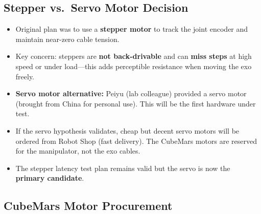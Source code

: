 \documentclass[11pt, a4paper]{article}
\begin{document}
\subsection{Stepper vs.\ Servo Motor Decision}
\label{sec:motor-choice}

\begin{itemize}[nosep]
  \item Original plan was to use a \textbf{stepper motor} to track the joint
    encoder and maintain near-zero cable tension.
  \item Key concern: steppers are \textbf{not back-drivable} and can
    \textbf{miss steps} at high speed or under load---this adds perceptible
    resistance when moving the exo freely.
  \item \textbf{Servo motor alternative:} Peiyu (lab colleague) provided a
    servo motor (brought from China for personal use).  This will be the
    first hardware under test.
  \item If the servo hypothesis validates, cheap but decent servo motors will
    be ordered from Robot Shop (fast delivery).  The CubeMars motors are
    reserved for the manipulator, not the exo cables.
  \item The stepper latency test plan remains valid but the servo is now
    the \textbf{primary candidate}.
\end{itemize}

\subsection{CubeMars Motor Procurement}
\label{sec:cubemarks-procurement}
\end{document}
